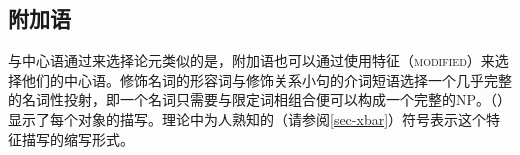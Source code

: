 \subsection{附加语}
\label{Abschnitt-HPSG-Adjunkte}\label{sec-adjuncts-hpsg}

与中心语通过\subcatc 来选择论元类似的是，附加语也可以通过使用特征（\textsc{modified}）来选择他们的中心语。修饰名词的形容词与修饰关系小句的介词短语选择一个几乎完整的名词性投射，即一个名词只需要与限定词相组合便可以构成一个完整的NP。（）显示了每个对象的描写。\xbarc 理论中为人熟知的（请参阅\ref{sec-xbar}）符号\nbarc 表示这个特征描写的缩写形式。

